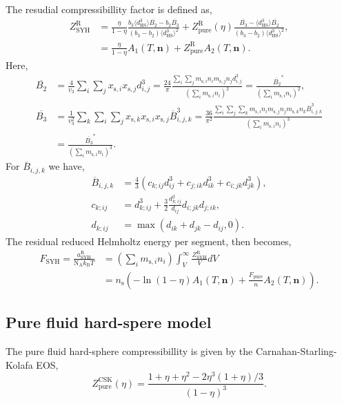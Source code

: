 \documentclass[english]{../thermomemo/thermomemo}
\newcommand*{\lb}{\left(}
\newcommand*{\rb}{\right)}
\newcommand{\hs}{\text{HS}\xspace}
\newcommand{\seg}{\ensuremath{\text{s}}\xspace}
\newcommand{\mbn}{\ensuremath{\mathbf{n}}\xspace}
\newcommand{\pure}{\ensuremath{\text{pure}}\xspace}
\newcommand{\kB}{\ensuremath{k_{\text{B}}}\xspace}
\newcommand{\NA}{\ensuremath{\text{N}_{\text{A}}}\xspace}
\newcommand{\res}{\ensuremath{\text{R}}\xspace}
\newcommand{\SYH}{\ensuremath{\text{SYH}}\xspace}
\newcommand{\CSK}{\ensuremath{\text{CSK}}\xspace}
\begin{document}
The resudial compressibillity factor is defined as,
\begin{align}
  \label{eq:Z_syh}
  Z_\SYH^\res &= \frac{\eta}{1-\eta} \frac{b_3 \langle d_\hs^3 \rangle \overline{B_2} - b_2 \overline{B_3}}{\lb b_3-b_2\rb\langle d_\hs^3 \rangle^2} +  Z^\res_\pure\lb\eta\rb \frac{\overline{B_3} - \langle d_\hs^3 \rangle \overline{B_2}}{\lb b_3-b_2\rb\langle d_\hs^3 \rangle^2},\\
  &= \frac{\eta}{1-\eta} A_1\lb T, \mbn  \rb +  Z^\res_\pure A_2\lb T,\mbn \rb.
\end{align}
Here,
\begin{align}
  \label{eq:syh_B}
  \overline{B_2} &= \frac{4}{v_3}\sum_i \sum_j x_{\seg,i} x_{\seg,j} d_{i,j}^3 = \frac{24 }{\pi}\frac{\sum_i \sum_j m_{\seg,i} n_{i} m_{\seg,j} n_{j} d_{i,j}^3}{\lb \sum_i m_{\seg,i} n_{i} \rb^2} =  \frac{\overline{B_2}^*}{\lb \sum_i m_{\seg,i} n_{i} \rb^2},\\
  \overline{B_3} &= \frac{1}{v_3^2}\sum_k \sum_i \sum_j x_{\seg,k} x_{\seg,i} x_{\seg,j} \overline{B}_{i,j,k}^3 = \frac{36}{\pi^2}\frac{\sum_i \sum_j \sum_k m_{\seg,i} n_{i} m_{\seg,j} n_{j} m_{\seg,k} n_{k} \overline{B}_{i,j,k}^3}{\lb \sum_i m_{\seg,i} n_{i} \rb^3} \nonumber \\&= \frac{\overline{B_3}^*}{\lb \sum_i m_{\seg,i} n_{i} \rb^3}.
\end{align}
For $\overline{B}_{i,j,k}$ we have,
\begin{align}
  \label{eq:syh_B_ijk}
  \overline{B}_{i,j,k} &= \frac{4}{3} \lb c_{k;ij} d_{ij}^3 + c_{j;ik} d_{ik}^3 + c_{i;jk} d_{jk}^3\rb,\\
  c_{k;ij} &= d_{k;ij}^3 + \frac{3}{2}\frac{d_{k;ij}^2}{d_{ij}}d_{i;jk}d_{j;ik}, \\
  d_{k;ij} &= \max \lb d_{ik} + d_{jk} - d_{ij}, 0 \rb.
\end{align}
The residual reduced Helmholtz energy per segment, then becomes,
\begin{align}
  \label{eq:a_syh}
  F_\SYH = \frac{a_\SYH^\res}{ \NA \kB T}  &= \lb \sum_i m_{\seg,i} n_{i} \rb \int_V^\infty \frac{Z_\SYH^\res}{V} dV \nonumber \\&=  n_\seg \lb -\ln\lb 1-\eta\rb A_1\lb T, \mbn \rb +  \frac{F_\pure}{n} A_2\lb T, \mbn \rb \rb.
\end{align}

\subsection{Pure fluid hard-spere model}
The pure fluid hard-sphere compressibillity is given by the Carnahan-Starling-Kolafa \cite{Kolafa1986} EOS,
\begin{equation}
  \label{eq:z_hs_csk}
  Z_\pure^\CSK \lb \eta \rb = \frac{ 1 + \eta + \eta^2 - 2\eta^3\lb 1 + \eta\rb/3}{\lb 1-\eta\rb^3}.
\end{equation}
\end{document}

